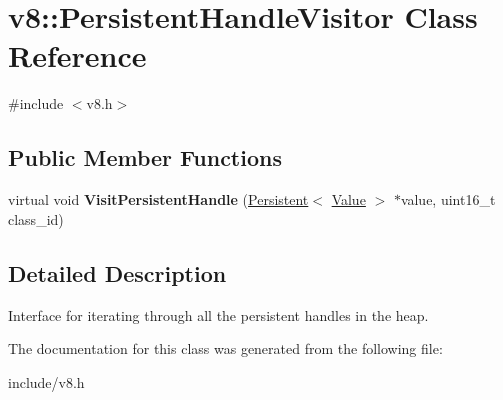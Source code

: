\hypertarget{classv8_1_1_persistent_handle_visitor}{}\section{v8\+:\+:Persistent\+Handle\+Visitor Class Reference}
\label{classv8_1_1_persistent_handle_visitor}


{\ttfamily \#include $<$v8.\+h$>$}

\subsection*{Public Member Functions}
\begin{DoxyCompactItemize}
\item 
virtual void {\bfseries Visit\+Persistent\+Handle} (\hyperlink{classv8_1_1_persistent}{Persistent}$<$ \hyperlink{classv8_1_1_value}{Value} $>$ $\ast$value, uint16\+\_\+t class\+\_\+id)\hypertarget{classv8_1_1_persistent_handle_visitor_a092c6cc7700b38d9c60bd693a071045a}{}\label{classv8_1_1_persistent_handle_visitor_a092c6cc7700b38d9c60bd693a071045a}

\end{DoxyCompactItemize}


\subsection{Detailed Description}
Interface for iterating through all the persistent handles in the heap. 

The documentation for this class was generated from the following file\+:\begin{DoxyCompactItemize}
\item 
include/v8.\+h\end{DoxyCompactItemize}
